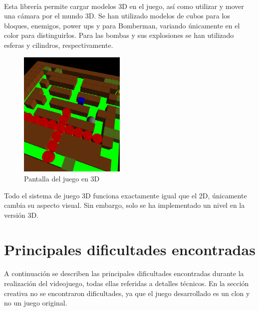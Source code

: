 \documentclass[a4paper]{article}
\begin{document}
\paragraph{}Esta librería permite cargar modelos 3D en el juego, así como utilizar y mover una cámara por el mundo 3D. Se han utilizado modelos de cubos para los bloques, enemigos, power ups y para Bomberman, variando únicamente en el color para distinguirlos. Para las bombas y sus explosiones se han utilizado esferas y cilindros, respectivamente.
\begin{figure}[H]
	\centering
	\includegraphics[width=2in]{bombermantresdes.png}
	\caption{Pantalla del juego en 3D}
	\label{fig:tresdes}
\end{figure}
Todo el sistema de juego 3D funciona exactamente igual que el 2D, únicamente cambia su aspecto visual. Sin embargo, solo se ha implementado un nivel en la versión 3D.
\newpage

\section{Principales dificultades encontradas}
\paragraph{}A continuación se describen las principales dificultades encontradas durante la realización del videojuego, todas ellas referidas a detalles técnicos. En la sección creativa no se encontraron dificultades, ya que el juego desarrollado es un clon y no un juego original.
\end{document}
